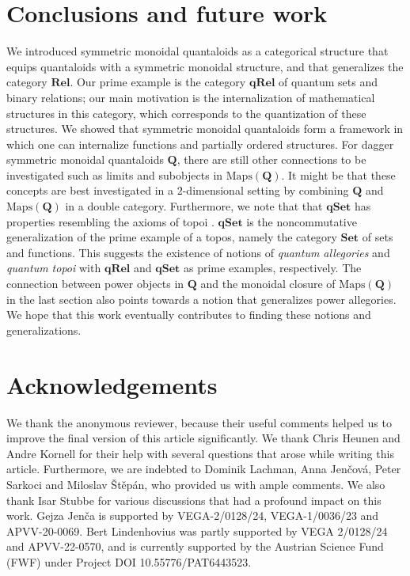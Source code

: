 \documentclass[12pt]{tac}
\theoremstyle{definition}
\theoremstyle{remark}
\newcommand{\<}{\langle}
\renewcommand{\>}{\rangle}
\renewcommand{\:}{\colon}
\begin{document}
\section{Conclusions and future work}
We introduced symmetric monoidal quantaloids as a categorical structure that equips quantaloids with a symmetric monoidal structure, and that generalizes the category $\mathbf{Rel}$. Our prime example is the category $\mathbf{qRel}$ of quantum sets and binary relations; our main motivation is the internalization of mathematical structures in this category, which corresponds to the quantization of these structures. We showed that symmetric monoidal quantaloids form a framework in which one can internalize functions and partially ordered structures. For dagger symmetric monoidal quantaloids $\mathbf Q$, there are still other connections to be investigated  such as limits and subobjects in $\mathrm{Maps}(\mathbf{Q})$. It might be that these concepts are best investigated in a $2$-dimensional setting by combining $\mathbf Q$ and $\mathrm{Maps}(\mathbf{Q})$ in a double category.  Furthermore, we note that that $\mathbf{qSet}$ has properties resembling the axioms of topoi \cite{Kornell18}. $\mathbf{qSet}$ is the noncommutative generalization of the prime example of a topos, namely the category $\mathbf{Set}$ of sets and functions. This suggests the existence of notions of \emph{quantum allegories} and \emph{quantum topoi} with $\mathbf{qRel}$ and $\mathbf{qSet}$ as prime examples, respectively. The connection between power objects in $\mathbf{Q}$ and the monoidal closure of $\mathrm{Maps}(\mathbf Q)$ in the last section also points towards a notion that generalizes power allegories. We hope that this work eventually contributes to finding these notions and generalizations.

\section*{Acknowledgements}
We thank the anonymous reviewer, because their useful comments helped us to improve the final version of this article significantly. 
We thank Chris Heunen and Andre Kornell for their help with several questions that arose while writing this article. Furthermore, we are indebted to Dominik Lachman, Anna Jen\v{c}ová, Peter Sarkoci and Miloslav Štěpán, who provided us with ample comments. We also thank Isar Stubbe for various discussions that had a profound impact on this work. Gejza Jen\v{c}a is supported by  VEGA-2/0128/24, VEGA-1/0036/23 and APVV-20-0069. Bert Lindenhovius was partly supported by VEGA 2/0128/24 and APVV-22-0570, and is currently supported by the Austrian Science Fund (FWF) under Project DOI 10.55776/PAT6443523.
\end{document}
